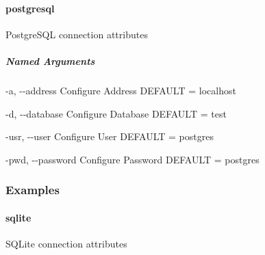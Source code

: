 \documentclass[letterpaper,10pt,english,openany,oneside]{sphinxmanual}
\begin{document}
\paragraph{postgresql}
\label{\detokenize{cmd_main:postgresql}}
PostgreSQL connection attributes

\begin{sphinxVerbatim}[commandchars=\\\{\}]
   \PYG{p}{[}\PYG{p}{]} \PYG{p}{[} \PYG{p}{]} \PYG{p}{[} \PYG{p}{]} \PYG{p}{[} \PYG{p}{]}
                        \PYG{p}{[} \PYG{p}{]}
\end{sphinxVerbatim}


\subparagraph{Named Arguments}
\label{\detokenize{cmd_main:Named Arguments_repeat13}}\begin{optionlist}{3cm}
\item [-a, -{-}address]  
Configure Address DEFAULT = localhost
\item [-d, -{-}database]  
Configure Database DEFAULT = test
\item [-usr, -{-}user]  
Configure User DEFAULT = postgres
\item [-pwd, -{-}password]  
Configure Password DEFAULT = postgres
\end{optionlist}

\subsubsection{Examples}

\begin{sphinxVerbatim}[commandchars=\\\{\}]
        
\end{sphinxVerbatim}

\paragraph{sqlite}
\label{\detokenize{cmd_main:sqlite}}
SQLite connection attributes

\begin{sphinxVerbatim}[commandchars=\\\{\}]
   \PYG{p}{[}\PYG{p}{]} \PYG{p}{[} \PYG{p}{]}
\end{sphinxVerbatim}
\end{document}
